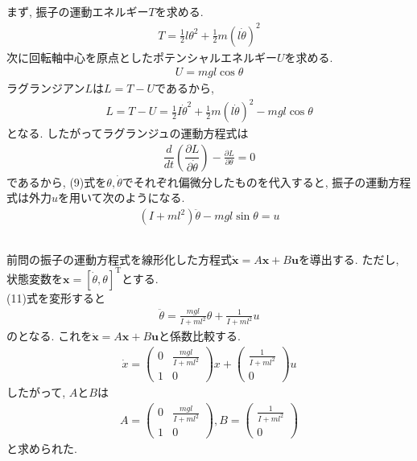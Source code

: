 \documentclass[a4paper,11pt]{jsarticle}
\begin{document}
\subsection{}
まず, 振子の運動エネルギー$T$を求める.
\begin{align}
	T=\frac{1}{2}l\theta^2+\frac{1}{2}m(l\dot{\theta})^2
\end{align}
次に回転軸中心を原点としたポテンシャルエネルギー$U$を求める.
\begin{align}
	U=mgl\cos\theta
\end{align}
ラグランジアン$L$は$L=T-U$であるから,
\begin{align}
	L=T-U=\frac{1}{2}I\dot{\theta}^2+\frac{1}{2}m(l\dot{\theta})^2-mgl\cos\theta
\end{align}
となる. したがってラグランジュの運動方程式は
\begin{align}
	\dfrac{d}{dt}\left(\dfrac {\partial L}{\partial \dot{\theta}}\right)-\frac{\partial L}{\partial \theta}=0
\end{align}
であるから, (9)式を$\theta,\dot{\theta}$でそれぞれ偏微分したものを代入すると, 振子の運動方程式は外力$u$を用いて次のようになる.
\begin{align}
	(I+ml^2)\ddot{\theta}-mgl\sin\theta=u
\end{align}
\subsection{}
前問の振子の運動方程式を線形化した方程式$\bm{\dot{x}}=A\bm{x}+B\bm{u}$を導出する. ただし, 状態変数を$\bm{x}=\left[\dot{\theta},\theta\right]^{\mathrm{T}}$とする.\\
(11)式を変形すると
\begin{align}
	\ddot{\theta}=\frac{mgl}{I+ml^2}\theta+\frac{1}{I+ml^2}u
\end{align}
のとなる. これを$\bm{\dot{x}}=A\bm{x}+B\bm{u}$と係数比較する.
\begin{align}
	\dot{x}=\left(
	\begin{array}{cc}
	0 & \frac{mgl}{I+ml^2} \\
	1 & 0
	\end{array}\right)x+\left(
	\begin{array}{c}
	\frac{1}{I+ml^2} \\
	0
	\end{array}\right)u
\end{align}
したがって, $A$と$B$は
\begin{align}
	A=\left(
	\begin{array}{cc}
	0 & \frac{mgl}{I+ml^2} \\
	1 & 0
	\end{array}\right),
	B=\left(
	\begin{array}{c}
	\frac{1}{I+ml^2} \\
	0
	\end{array}\right)
\end{align}
と求められた.
\end{document}
